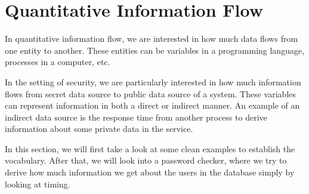 \section{Quantitative Information Flow}
In quantitative information flow, we are interested in how much data
flows from one entity to another. These entities can be variables in
a programming language, processes in a computer, etc.

In the setting of security, we are particularly interested in how much information
flows from secret data source to public data source of a system. These variables
can represent information in both a direct or indirect manner. 
An example of an indirect data source is the response time from another process
to derive information about some private data in the service.

In this section, we will first take a look at some clean examples to establish
the vocabulary. After that, we will look into a password checker, where we try
to derive how much information we get about the users in the database simply
by looking at timing.

